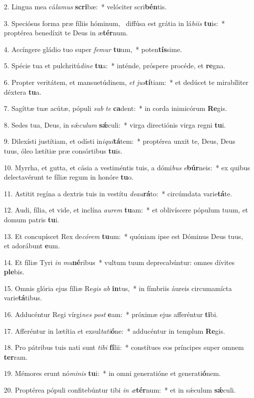 2. Lingua mea cá\textit{la}\textit{mus} \textbf{scri}bæ:~*  velóciter scri\textbf{bén}tis.\

3. Speciósus forma præ fíliis hóminum, \dag\  diffúsa est grátia in lá\textit{bi}\textit{is} \textbf{tu}is:~*  proptérea benedíxit te Deus in æ\textbf{tér}num.\

4. Accíngere gládio tuo super \textit{fe}\textit{mur} \textbf{tu}um,~*  poten\textbf{tís}sime.\

5. Spécie tua et pulchritú\textit{di}\textit{ne} \textbf{tu}a:~*  inténde, próspere procéde, et \textbf{re}gna.\

6. Propter veritátem, et mansuetúdinem, \textit{et} \textit{jus}\textbf{tí}tiam:~*  et dedúcet te mirabíliter déxtera \textbf{tu}a.\

7. Sagíttæ tuæ acútæ, pópuli \textit{sub} \textit{te} \textbf{ca}dent:~*  in corda inimicórum \textbf{Re}gis.\

8. Sedes tua, Deus, in sǽ\textit{cu}\textit{lum} \textbf{sǽ}culi:~*  virga directiónis virga regni \textbf{tu}i.\

9. Dilexísti justítiam, et odísti in\textit{i}\textit{qui}\textbf{tá}tem:~*  proptérea unxit te, Deus, Deus tuus, óleo lætítiæ præ consórtibus \textbf{tu}is.\

10. Myrrha, et gutta, et cásia a vestiméntis tuis, a dómi\textit{bus} \textit{e}\textbf{búr}neis:~*  ex quibus delectavérunt te fíliæ regum in honóre \textbf{tu}o.\

11. Astitit regína a dextris tuis in vestítu \textit{de}\textit{au}\textbf{rá}to:~*  circúmdata varie\textbf{tá}te.\

12. Audi, fília, et vide, et inclína \textit{au}\textit{rem} \textbf{tu}am:~*  et oblivíscere pópulum tuum, et domum patris \textbf{tu}i.\

13. Et concupíscet Rex de\textit{có}\textit{rem} \textbf{tu}um:~*  quóniam ipse est Dóminus Deus tuus, et adorábunt \textbf{e}um.\

14. Et fíliæ Tyri \textit{in} \textit{mu}\textbf{né}ribus~*  vultum tuum deprecabúntur: omnes dívites \textbf{ple}bis.\

15. Omnis glória ejus fíliæ Re\textit{gis} \textit{ab} \textbf{in}tus,~*  in fímbriis áureis circumamícta varie\textbf{tá}tibus.\

16. Adducéntur Regi vírgi\textit{nes} \textit{post} \textbf{e}am:~*  próximæ ejus afferéntur \textbf{ti}bi.\

17. Afferéntur in lætítia et exsul\textit{ta}\textit{ti}\textbf{ó}ne:~*  adducéntur in templum \textbf{Re}gis.\

18. Pro pátribus tuis nati sunt \textit{ti}\textit{bi} \textbf{fí}lii:~*  constítues eos príncipes super omnem \textbf{ter}ram.\

19. Mémores erunt nó\textit{mi}\textit{nis} \textbf{tu}i:~*  in omni generatióne et generati\textbf{ó}nem.\

20. Proptérea pópuli confitebúntur tibi \textit{in} \textit{æ}\textbf{tér}num:~*  et in sǽculum \textbf{sǽ}culi.\


